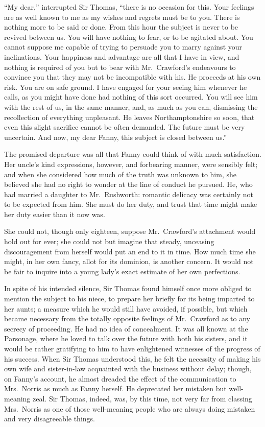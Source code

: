 \documentclass{article}
\begin{document}
``My dear,'' interrupted Sir Thomas, ``there is no
occasion for this.  Your feelings are as well known
to me as my wishes and regrets must be to you.
There is nothing more to be said or done.  From this
hour the subject is never to be revived between us.
You will have nothing to fear, or to be agitated about.
You cannot suppose me capable of trying to persuade you
to marry against your inclinations.  Your happiness
and advantage are all that I have in view, and nothing is
required of you but to bear with Mr.\ Crawford's endeavours
to convince you that they may not be incompatible with his.
He proceeds at his own risk.  You are on safe ground.
I have engaged for your seeing him whenever he calls,
as you might have done had nothing of this sort occurred.
You will see him with the rest of us, in the same manner,
and, as much as you can, dismissing the recollection of
everything unpleasant.  He leaves Northamptonshire so soon,
that even this slight sacrifice cannot be often demanded.
The future must be very uncertain.  And now, my dear Fanny,
this subject is closed between us.''

The promised departure was all that Fanny could think
of with much satisfaction.  Her uncle's kind expressions,
however, and forbearing manner, were sensibly felt;
and when she considered how much of the truth was unknown
to him, she believed she had no right to wonder at the line
of conduct he pursued.  He, who had married a daughter
to Mr.\ Rushworth:  romantic delicacy was certainly not
to be expected from him.  She must do her duty, and trust
that time might make her duty easier than it now was.

She could not, though only eighteen, suppose Mr.\ Crawford's
attachment would hold out for ever; she could not
but imagine that steady, unceasing discouragement from
herself would put an end to it in time.  How much time
she might, in her own fancy, allot for its dominion,
is another concern.  It would not be fair to inquire
into a young lady's exact estimate of her own perfections.

In spite of his intended silence, Sir Thomas found himself
once more obliged to mention the subject to his niece,
to prepare her briefly for its being imparted to her aunts;
a measure which he would still have avoided, if possible,
but which became necessary from the totally opposite
feelings of Mr.\ Crawford as to any secrecy of proceeding.
He had no idea of concealment.  It was all known at
the Parsonage, where he loved to talk over the future
with both his sisters, and it would be rather gratifying
to him to have enlightened witnesses of the progress
of his success.  When Sir Thomas understood this, he felt
the necessity of making his own wife and sister-in-law
acquainted with the business without delay; though,
on Fanny's account, he almost dreaded the effect of the
communication to Mrs.\ Norris as much as Fanny herself.
He deprecated her mistaken but well-meaning zeal.
Sir Thomas, indeed, was, by this time, not very far from
classing Mrs.\ Norris as one of those well-meaning people
who are always doing mistaken and very disagreeable things.
\end{document}
